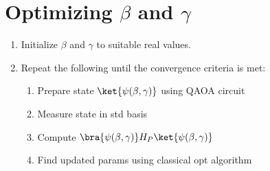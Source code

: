 \documentclass[preprint,aps,prd,nofootinbib,superscriptaddress]{revtex4-2}
\begin{document}
\section{Optimizing $\beta$ and $\gamma$}
%

\begin{enumerate}
\item Initialize $\beta$ and $\gamma$ to suitable real values.
\item Repeat the following until the convergence criteria is met:
\begin{enumerate}
  	\item Prepare state $\ket{\psi(\beta, \gamma)}$ using QAOA circuit
  	\item Measure state in std basis
  	\item Compute $\bra{\psi(\beta, \gamma)} H_P \ket{\psi(\beta, \gamma)}$
  	\item Find updated params using classical opt algorithm
\end{enumerate}
\end{enumerate}
%






\begin{thebibliography}{99}



\end{thebibliography}
\end{document}
